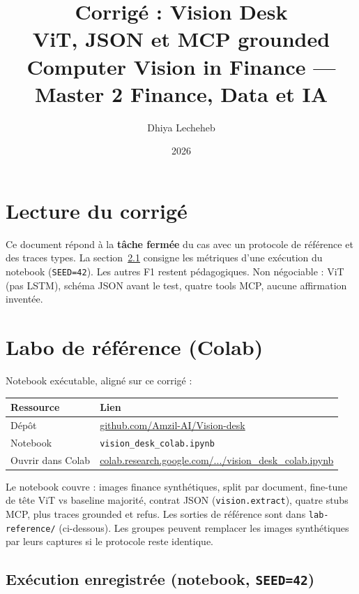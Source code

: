 \documentclass[11pt,a4paper]{article}
\title{%
  \textbf{Corrigé : Vision Desk}\\[0.35em]
  \large ViT, JSON et MCP grounded\\[0.5em]
  \normalsize Computer Vision in Finance --- Master 2 Finance, Data et IA
}
\author{Dhiya Lecheheb}
\date{2026}
\begin{document}
\maketitle
\thispagestyle{empty}

\section{Lecture du corrigé}

Ce document répond à la \textbf{tâche fermée} du cas avec un protocole de
référence et des traces types. La section~\ref{sec:lab-run} consigne les métriques
d'une exécution du notebook (\texttt{SEED=42}). Les autres F1 restent pédagogiques.
Non négociable : ViT (pas LSTM), schéma JSON avant le test, quatre tools MCP,
aucune affirmation inventée.

\section{Labo de référence (Colab)}

Notebook exécutable, aligné sur ce corrigé :

\begin{center}
\renewcommand{\arraystretch}{1.15}
\begin{tabular}{@{}p{3.2cm}p{11.4cm}@{}}
\toprule
\textbf{Ressource} & \textbf{Lien} \\
\midrule
Dépôt & \href{https://github.com/Amzil-AI/Vision-desk}{github.com/Amzil-AI/Vision-desk} \\
Notebook & \texttt{vision\_desk\_colab.ipynb} \\
Ouvrir dans Colab & \href{https://colab.research.google.com/github/Amzil-AI/Vision-desk/blob/main/vision_desk_colab.ipynb}{colab.research.google.com/.../vision\_desk\_colab.ipynb} \\
\bottomrule
\end{tabular}
\end{center}

Le notebook couvre : images finance synthétiques, split par document, fine-tune
de tête ViT vs baseline majorité, contrat JSON (\texttt{vision.extract}), quatre
stubs MCP, plus traces grounded et refus. Les sorties de référence sont dans
\texttt{lab-reference/} (ci-dessous). Les groupes peuvent remplacer les images
synthétiques par leurs captures si le protocole reste identique.

\subsection{Exécution enregistrée (notebook, \texttt{SEED=42})}
\label{sec:lab-run}
\end{document}
